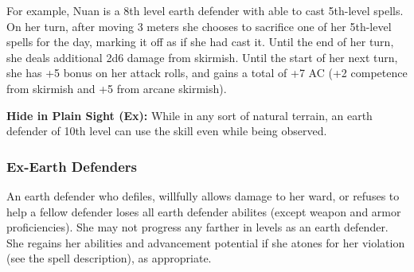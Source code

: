 {For example, Nuan is a 8th level earth defender with able to cast 5th-level spells. On her turn, after moving 3 meters she chooses to sacrifice one of her 5th-level spells for the day, marking it off as if she had cast it. Until the end of her turn, she deals additional 2d6 damage from skirmish. Until the start of her next turn, she has +5 bonus on her attack rolls, and gains a total of +7 AC (+2 competence from skirmish and +5 from arcane skirmish).

\textbf{Hide in Plain Sight (Ex):} While in any sort of natural terrain, an earth defender of 10th level can use the  skill even while being observed.

\subsubsection{Ex-Earth Defenders}
An earth defender who defiles, willfully allows damage to her ward, or refuses to help a fellow defender loses all earth defender abilites (except weapon and armor proficiencies). She may not progress any farther in levels as an earth defender. She regains her abilities and advancement potential if she atones for her violation (see the  spell description), as appropriate.
}